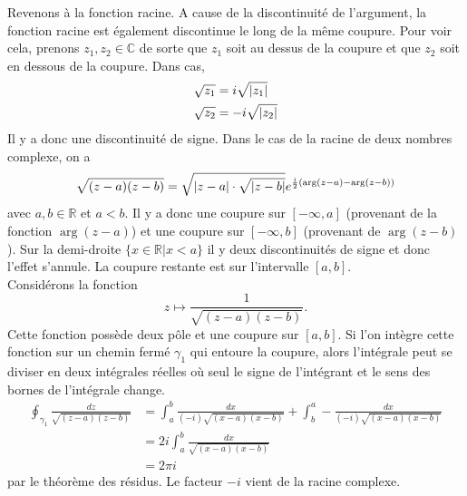 \documentclass[a4paper,11pt]{report}
\begin{document}
            
            Revenons à la fonction racine. A cause de la discontinuité de l'argument, la fonction racine est également discontinue le long de la même coupure. Pour voir cela, prenons $z_1,z_2\in\mathbb{C}$ de sorte que $z_1$ soit au dessus de la coupure et que $z_2$ soit en dessous de la coupure. Dans cas,
            \begin{align}
                \sqrt{z_1} &= i\sqrt{\abs{z_1}}\\
                \sqrt{z_2} &= -i\sqrt{\abs{z_2}}
            \end{align}
            Il y a donc une discontinuité de signe. Dans le cas de la racine de deux nombres complexe, on a 
            \begin{equation}
                \sqrt{(z-a)(z-b)} = \sqrt{\abs{z-a}\cdot\sqrt{\abs{z-b}}}e^{\frac{i}{2}\left( \arg(z-a)-\arg(z-b) \right)}
            \end{equation}
            avec $a,b\in\mathbb{R}$ et $a<b$. Il y a donc une coupure sur $[-\infty,a]$ (provenant de la fonction $\arg(z-a)$) et une coupure sur $[-\infty,b]$ (provenant de $\arg(z-b)$). Sur la demi-droite $\{x\in\mathbb{R}|x<a\}$ il y deux discontinuités de signe et donc l'effet s'annule. La coupure restante est sur l'intervalle $[a,b]$.\\
            
            Considérons la fonction
            \begin{equation*}
                z\mapsto \frac{1}{\sqrt{\left( z-a \right)\left( z-b \right)}}.
            \end{equation*}
            Cette fonction possède deux pôle et une coupure sur $[a,b]$. Si l'on intègre cette fonction sur un chemin fermé $\gamma_1$ qui entoure la coupure, alors l'intégrale peut se diviser en deux intégrales réelles où seul le signe de l'intégrant et le sens des bornes de l'intégrale change.
            \begin{align}
                \oint_{\gamma_1}\frac{dz}{\sqrt{\left( z-a \right)\left( z-b \right)}} &= \int_a^b \frac{dx}{(-i)\sqrt{\left( x-a \right)\left( x-b \right)}}+\int_b^a -\frac{dx}{(-i)\sqrt{\left( x-a \right)\left( x-b \right)}}\\
                &= 2i\int_a^b \frac{dx}{\sqrt{\left( x-a \right)\left( x-b \right)}}\\
                &= 2\pi i
            \end{align}
            par le théorème des résidus. Le facteur $-i$ vient de la racine complexe.\\
            
\end{document}
